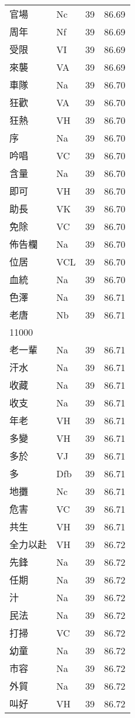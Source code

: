 \documentclass[twocolumn]{book}
\begin{document}
\begin{supertabular}{llrr}
官場 & Nc & 39 &  86.69\\
周年 & Nf & 39 &  86.69\\
受限 & VI & 39 &  86.69\\
來襲 & VA & 39 &  86.69\\
車隊 & Na & 39 &  86.70\\
狂歡 & VA & 39 &  86.70\\
狂熱 & VH & 39 &  86.70\\
序 & Na & 39 &  86.70\\
吟唱 & VC & 39 &  86.70\\
含量 & Na & 39 &  86.70\\
即可 & VH & 39 &  86.70\\
助長 & VK & 39 &  86.70\\
免除 & VC & 39 &  86.70\\
佈告欄 & Na & 39 &  86.70\\
位居 & VCL & 39 &  86.70\\
血統 & Na & 39 &  86.70\\
色澤 & Na & 39 &  86.71\\
老唐 & Nb & 39 &  86.71\\
11000\\
老一輩 & Na & 39 &  86.71\\
汗水 & Na & 39 &  86.71\\
收藏 & Na & 39 &  86.71\\
收支 & Na & 39 &  86.71\\
年老 & VH & 39 &  86.71\\
多變 & VH & 39 &  86.71\\
多於 & VJ & 39 &  86.71\\
多 & Dfb & 39 &  86.71\\
地攤 & Nc & 39 &  86.71\\
危害 & VC & 39 &  86.71\\
共生 & VH & 39 &  86.71\\
全力以赴 & VH & 39 &  86.72\\
先鋒 & Na & 39 &  86.72\\
任期 & Na & 39 &  86.72\\
汁 & Na & 39 &  86.72\\
民法 & Na & 39 &  86.72\\
打掃 & VC & 39 &  86.72\\
幼童 & Na & 39 &  86.72\\
市容 & Na & 39 &  86.72\\
外貿 & Na & 39 &  86.72\\
叫好 & VH & 39 &  86.72\\

\end{supertabular}
\end{document}
